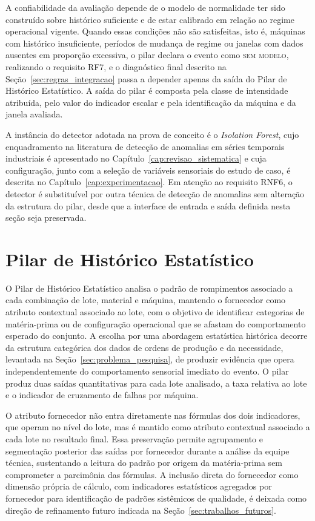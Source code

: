 A confiabilidade da avaliação depende de o modelo de normalidade ter sido construído sobre histórico suficiente e de estar calibrado em relação ao regime operacional vigente. Quando essas condições não são satisfeitas, isto é, máquinas com histórico insuficiente, períodos de mudança de regime ou janelas com dados ausentes em proporção excessiva, o pilar declara o evento como \textsc{sem modelo}, realizando o requisito RF7, e o diagnóstico final descrito na Seção~\ref{sec:regras_integracao} passa a depender apenas da saída do Pilar de Histórico Estatístico. A saída do pilar é composta pela classe de intensidade atribuída, pelo valor do indicador escalar e pela identificação da máquina e da janela avaliada.

A instância do detector adotada na prova de conceito é o \emph{Isolation Forest}, cujo enquadramento na literatura de detecção de anomalias em séries temporais industriais é apresentado no Capítulo~\ref{cap:revisao_sistematica} e cuja configuração, junto com a seleção de variáveis sensoriais do estudo de caso, é descrita no Capítulo~\ref{cap:experimentacao}. Em atenção ao requisito RNF6, o detector é substituível por outra técnica de detecção de anomalias sem alteração da estrutura do pilar, desde que a interface de entrada e saída definida nesta seção seja preservada.


\section{Pilar de Histórico Estatístico}
\label{sec:impl_historico}

O Pilar de Histórico Estatístico analisa o padrão de rompimentos associado a cada combinação de lote, material e máquina, mantendo o fornecedor como atributo contextual associado ao lote, com o objetivo de identificar categorias de matéria-prima ou de configuração operacional que se afastam do comportamento esperado do conjunto. A escolha por uma abordagem estatística histórica decorre da estrutura categórica dos dados de ordens de produção e da necessidade, levantada na Seção~\ref{sec:problema_pesquisa}, de produzir evidência que opera independentemente do comportamento sensorial imediato do evento. O pilar produz duas saídas quantitativas para cada lote analisado, a taxa relativa ao lote e o indicador de cruzamento de falhas por máquina.

O atributo fornecedor não entra diretamente nas fórmulas dos dois indicadores, que operam no nível do lote, mas é mantido como atributo contextual associado a cada lote no resultado final. Essa preservação permite agrupamento e segmentação posterior das saídas por fornecedor durante a análise da equipe técnica, sustentando a leitura do padrão por origem da matéria-prima sem comprometer a parcimônia das fórmulas. A inclusão direta do fornecedor como dimensão própria de cálculo, com indicadores estatísticos agregados por fornecedor para identificação de padrões sistêmicos de qualidade, é deixada como direção de refinamento futuro indicada na Seção~\ref{sec:trabalhos_futuros}.


